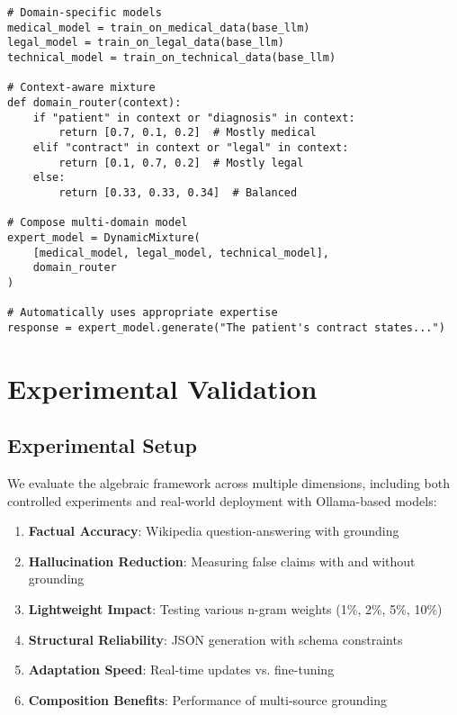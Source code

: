 \documentclass{article}
\theoremstyle{definition}
\begin{document}
\begin{lstlisting}
# Domain-specific models
medical_model = train_on_medical_data(base_llm)
legal_model = train_on_legal_data(base_llm)
technical_model = train_on_technical_data(base_llm)

# Context-aware mixture
def domain_router(context):
    if "patient" in context or "diagnosis" in context:
        return [0.7, 0.1, 0.2]  # Mostly medical
    elif "contract" in context or "legal" in context:
        return [0.1, 0.7, 0.2]  # Mostly legal
    else:
        return [0.33, 0.33, 0.34]  # Balanced

# Compose multi-domain model
expert_model = DynamicMixture(
    [medical_model, legal_model, technical_model],
    domain_router
)

# Automatically uses appropriate expertise
response = expert_model.generate("The patient's contract states...")
\end{lstlisting}

\section{Experimental Validation}

\subsection{Experimental Setup}

We evaluate the algebraic framework across multiple dimensions, including both controlled experiments and real-world deployment with Ollama-based models:
\begin{enumerate}
    \item \textbf{Factual Accuracy}: Wikipedia question-answering with grounding
    \item \textbf{Hallucination Reduction}: Measuring false claims with and without grounding
    \item \textbf{Lightweight Impact}: Testing various n-gram weights (1\%, 2\%, 5\%, 10\%)
    \item \textbf{Structural Reliability}: JSON generation with schema constraints
    \item \textbf{Adaptation Speed}: Real-time updates vs. fine-tuning
    \item \textbf{Composition Benefits}: Performance of multi-source grounding
\end{enumerate}
\end{document}
